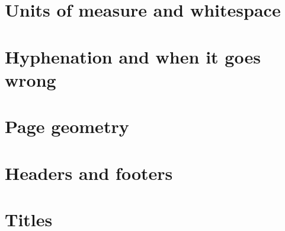 \section{Units of measure and whitespace}

\section{Hyphenation and when it goes wrong}

\section{Page geometry}


\section{Headers and footers}

\section{Titles}

